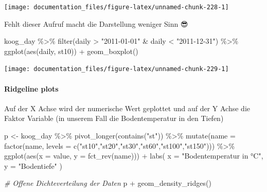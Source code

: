 \documentclass[
]{article}
\newenvironment{Shaded}{\begin{snugshade}}{\end{snugshade}}
\newcommand{\AttributeTok}[1]{\textcolor[rgb]{0.77,0.63,0.00}{#1}}
\newcommand{\CommentTok}[1]{\textcolor[rgb]{0.56,0.35,0.01}{\textit{#1}}}
\newcommand{\FunctionTok}[1]{\textcolor[rgb]{0.00,0.00,0.00}{#1}}
\newcommand{\NormalTok}[1]{#1}
\newcommand{\OtherTok}[1]{\textcolor[rgb]{0.56,0.35,0.01}{#1}}
\newcommand{\SpecialCharTok}[1]{\textcolor[rgb]{0.00,0.00,0.00}{#1}}
\newcommand{\StringTok}[1]{\textcolor[rgb]{0.31,0.60,0.02}{#1}}
\begin{document}
\begin{center}\texttt{[image: documentation\_files/figure-latex/unnamed-chunk-228-1]} \end{center}

Fehlt dieser Aufruf macht die Darstellung weniger Sinn 😎

\begin{Shaded}
\begin{Highlighting}[]
\NormalTok{koog\_day }\SpecialCharTok{\%\textgreater{}\%}
  \FunctionTok{filter}\NormalTok{(daily }\SpecialCharTok{\textgreater{}} \StringTok{"2011{-}01{-}01"} \SpecialCharTok{\&}\NormalTok{ daily }\SpecialCharTok{\textless{}} \StringTok{"2011{-}12{-}31"}\NormalTok{) }\SpecialCharTok{\%\textgreater{}\%}
  \FunctionTok{ggplot}\NormalTok{(}\FunctionTok{aes}\NormalTok{(daily, st10)) }\SpecialCharTok{+}
  \FunctionTok{geom\_boxplot}\NormalTok{()}
\end{Highlighting}
\end{Shaded}

\begin{center}\texttt{[image: documentation\_files/figure-latex/unnamed-chunk-229-1]} \end{center}

\hypertarget{ridgeline-plots}{%
\paragraph{Ridgeline plots}\label{ridgeline-plots}}

Auf der X Achse wird der numerische Wert geplottet und auf der Y Achse die Faktor Variable (in unserem Fall die Bodentemperatur in den Tiefen)

\begin{Shaded}
\begin{Highlighting}[]
\NormalTok{p }\OtherTok{\textless{}{-}}\NormalTok{ koog\_day }\SpecialCharTok{\%\textgreater{}\%}
  \FunctionTok{pivot\_longer}\NormalTok{(}\FunctionTok{contains}\NormalTok{(}\StringTok{"st"}\NormalTok{)) }\SpecialCharTok{\%\textgreater{}\%}
  \FunctionTok{mutate}\NormalTok{(}\AttributeTok{name =} \FunctionTok{factor}\NormalTok{(name, }\AttributeTok{levels =} \FunctionTok{c}\NormalTok{(}\StringTok{"st10"}\NormalTok{,}\StringTok{"st20"}\NormalTok{,}\StringTok{"st30"}\NormalTok{,}\StringTok{"st60"}\NormalTok{,}\StringTok{"st100"}\NormalTok{,}\StringTok{"st150"}\NormalTok{))) }\SpecialCharTok{\%\textgreater{}\%}
  \FunctionTok{ggplot}\NormalTok{(}\FunctionTok{aes}\NormalTok{(}\AttributeTok{x =}\NormalTok{ value, }\AttributeTok{y =} \FunctionTok{fct\_rev}\NormalTok{(name))) }\SpecialCharTok{+}
  \FunctionTok{labs}\NormalTok{(}
    \AttributeTok{x =} \StringTok{"Bodentemperatur in °C"}\NormalTok{, }
    \AttributeTok{y =} \StringTok{"Bodentiefe"}
\NormalTok{  )}

\CommentTok{\# Offene Dichteverteilung der Daten}
\NormalTok{p }\SpecialCharTok{+} \FunctionTok{geom\_density\_ridges}\NormalTok{()}
\end{Highlighting}
\end{Shaded}
\end{document}
